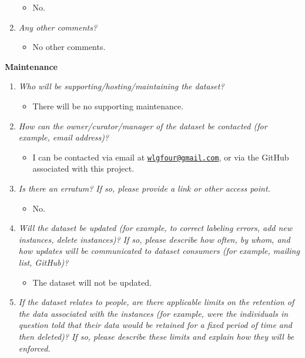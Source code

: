 \documentclass[
]{article}
\providecommand{\tightlist}{%
  \setlength{\itemsep}{0pt}\setlength{\parskip}{0pt}}
\begin{document}
\begin{enumerate}
  \begin{itemize}
  \tightlist
  \item
    No.
  \end{itemize}
\item
  \emph{Any other comments?}

  \begin{itemize}
  \tightlist
  \item
    No other comments.
  \end{itemize}
\end{enumerate}

\textbf{Maintenance}

\begin{enumerate}
\def\labelenumi{\arabic{enumi}.}
\tightlist
\item
  \emph{Who will be supporting/hosting/maintaining the dataset?}

  \begin{itemize}
  \tightlist
  \item
    There will be no supporting maintenance.
  \end{itemize}
\item
  \emph{How can the owner/curator/manager of the dataset be contacted (for example, email address)?}

  \begin{itemize}
  \tightlist
  \item
    I can be contacted via email at \href{mailto:wlgfour@gmail.com}{\nolinkurl{wlgfour@gmail.com}}, or via the GitHub associated with this project.
  \end{itemize}
\item
  \emph{Is there an erratum? If so, please provide a link or other access point.}

  \begin{itemize}
  \tightlist
  \item
    No.
  \end{itemize}
\item
  \emph{Will the dataset be updated (for example, to correct labeling errors, add new instances, delete instances)? If so, please describe how often, by whom, and how updates will be communicated to dataset consumers (for example, mailing list, GitHub)?}

  \begin{itemize}
  \tightlist
  \item
    The dataset will not be updated.
  \end{itemize}
\item
  \emph{If the dataset relates to people, are there applicable limits on the retention of the data associated with the instances (for example, were the individuals in question told that their data would be retained for a fixed period of time and then deleted)? If so, please describe these limits and explain how they will be enforced.}


\end{enumerate}
\end{document}
